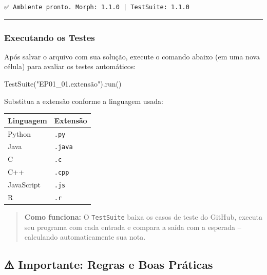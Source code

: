 \documentclass[
  portuguese,
  letterpaper,
  openany,
  oneside,
  12pt,
  a4paper]{book}
\newenvironment{Shaded}{\begin{snugshade}}{\end{snugshade}}
\newcommand{\NormalTok}[1]{\textcolor[rgb]{0.00,0.23,0.31}{#1}}
\newcommand{\StringTok}[1]{\textcolor[rgb]{0.13,0.47,0.30}{#1}}
\begin{document}
\begin{verbatim}
✅ Ambiente pronto. Morph: 1.1.0 | TestSuite: 1.1.0
\end{verbatim}

\begin{center}\rule{0.5\linewidth}{0.5pt}\end{center}

\subsubsection*{Executando os Testes}\label{executando-os-testes}

Após salvar o arquivo com sua solução, execute o comando abaixo (em uma
nova célula) para avaliar os testes automáticos:

\begin{Shaded}
\begin{Highlighting}[]
\NormalTok{TestSuite(}\StringTok{"EP01\_01.extensão"}\NormalTok{).run()}
\end{Highlighting}
\end{Shaded}

Substitua a extensão conforme a linguagem usada:

\begin{longtable}[]{@{}ll@{}}
\toprule\noalign{}
Linguagem & Extensão \\
\midrule\noalign{}
\endhead
\bottomrule\noalign{}
\endlastfoot
Python & \texttt{.py} \\
Java & \texttt{.java} \\
C & \texttt{.c} \\
C++ & \texttt{.cpp} \\
JavaScript & \texttt{.js} \\
R & \texttt{.r} \\
\end{longtable}

\begin{quote}
\textbf{Como funciona:} O \texttt{TestSuite} baixa os casos de teste do
GitHub, executa seu programa com cada entrada e compara a saída com a
esperada -- calculando automaticamente sua nota.
\end{quote}

\subsection*{⚠️ Importante: Regras e Boas
Práticas}\label{importante-regras-e-boas-pruxe1ticas}
\end{document}
